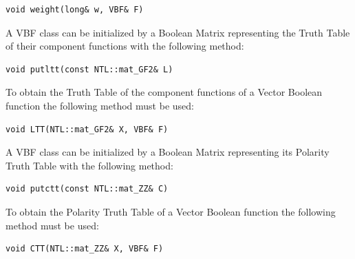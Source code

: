 \begin{verbatim}
void weight(long& w, VBF& F)
\end{verbatim}

A VBF class can be initialized by a Boolean Matrix representing the Truth Table of their component functions with the following method:

\begin{verbatim}
void putltt(const NTL::mat_GF2& L)
\end{verbatim}

To obtain the Truth Table of the component functions of a Vector Boolean function the following method must be used:

\begin{verbatim}
void LTT(NTL::mat_GF2& X, VBF& F)
\end{verbatim}

A VBF class can be initialized by a Boolean Matrix representing its Polarity Truth Table with the following method:

\begin{verbatim}
void putctt(const NTL::mat_ZZ& C)
\end{verbatim}

To obtain the Polarity Truth Table of a Vector Boolean function the following method must be used:

\begin{verbatim}
void CTT(NTL::mat_ZZ& X, VBF& F)
\end{verbatim}
  

